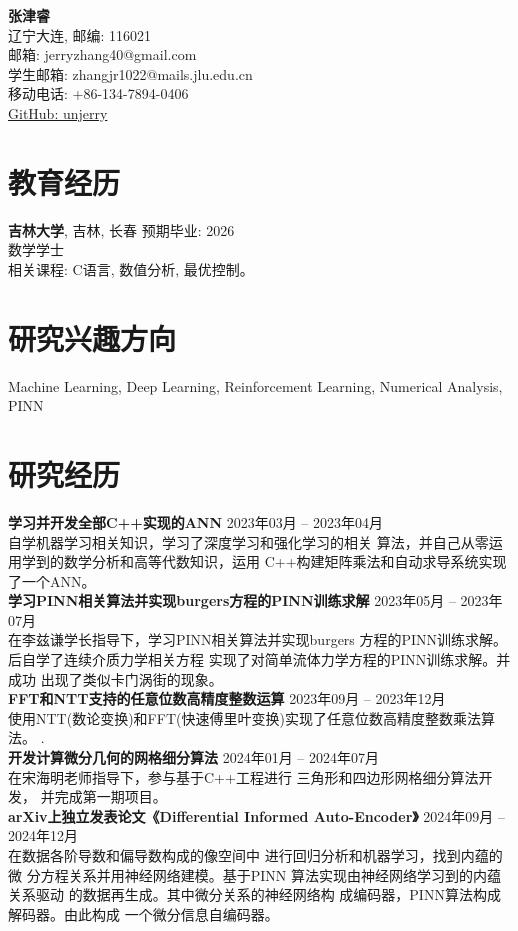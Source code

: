 \documentclass[a4paper,10pt]{article}
\begin{document}
\begin{center}
    {\LARGE \textbf{张津睿}}\\
    辽宁大连, 邮编: 116021 \\
    邮箱: jerryzhang40@gmail.com \\
    学生邮箱: zhangjr1022@mails.jlu.edu.cn \\
    移动电话: +86-134-7894-0406 \\
    \href{https://github.com/unjerry}{GitHub: unjerry}
\end{center}

\section*{教育经历}
\textbf{吉林大学}, 吉林, 长春  \hfill 预期毕业: 2026  \\
数学学士 \\
相关课程: C语言, 数值分析, 最优控制。

\section*{研究兴趣方向}
Machine Learning, Deep Learning, Reinforcement Learning, Numerical Analysis, PINN \\


\section*{研究经历}
\textbf{学习并开发全部C++实现的ANN}
\hfill 2023年03月 – 2023年04月\\
自学机器学习相关知识，学习了深度学习和强化学习的相关
算法，并自己从零运用学到的数学分析和高等代数知识，运用
C++构建矩阵乘法和自动求导系统实现了一个ANN。
\\
\textbf{学习PINN相关算法并实现burgers方程的PINN训练求解}
\hfill 2023年05月 – 2023年07月\\
在李兹谦学长指导下，学习PINN相关算法并实现burgers
方程的PINN训练求解。后自学了连续介质力学相关方程
实现了对简单流体力学方程的PINN训练求解。并成功
出现了类似卡门涡街的现象。
\\
\textbf{FFT和NTT支持的任意位数高精度整数运算}
\hfill 2023年09月 – 2023年12月\\
使用NTT(数论变换)和FFT(快速傅里叶变换)实现了任意位数高精度整数乘法算法。
\cite{firstApproachGithubProject}.
\\
\textbf{开发计算微分几何的网格细分算法}
\hfill 2024年01月 – 2024年07月\\
在宋海明老师指导下，参与基于C++工程进行
三角形和四边形网格细分算法开发，
并完成第一期项目。
\\
\textbf{arXiv上独立发表论文《Differential Informed Auto-Encoder》}
\hfill 2024年09月 – 2024年12月\\
在数据各阶导数和偏导数构成的像空间中
进行回归分析和机器学习，找到内蕴的微
分方程关系并用神经网络建模。基于PINN
算法实现由神经网络学习到的内蕴关系驱动
的数据再生成。其中微分关系的神经网络构
成编码器，PINN算法构成解码器。由此构成
一个微分信息自编码器。
\cite{zhang2024differentialinformedautoencoder}
\end{document}
